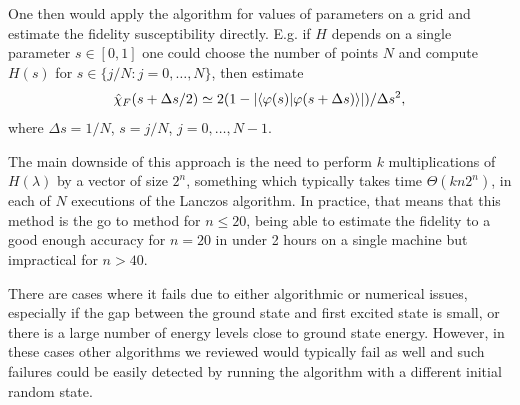 \documentclass[
  american,aps,pra,reprint,floatfix,nofootinbib,superscriptaddress
]{revtex4-2}
\newcommand{\abs}[1]{\left|#1\right|}
\begin{document}
One then would apply the algorithm for values of parameters on a grid
and estimate the fidelity susceptibility directly. E.g. if $H$ depends
on a single parameter $s\in[0,1]$ one could choose the number of points $N$
and compute $H(s)$ for $s\in\{j/N: j=0,\dots,N\}$, then estimate
\begin{equation}
  \hat \chi_F(s + \Delta s/2)
    \simeq 2 (1 - \abs{\braket{\varphi(s)| \varphi(s + \Delta s)}})
      / \Delta s^2,
\end{equation}
where $\Delta s = 1/N$, $s = j/N$, $j=0,\dots,N-1$.

The main downside of this approach is the need to perform $k$
multiplications of $H(\lambda)$ by a vector of size $2^n$, something
which typically takes time $\Theta(kn2^n)$, in each of $N$ executions
of the Lanczos algorithm. In practice, that means that
this method is the go to method for $n \leq 20$, being able to estimate
the fidelity to a good enough accuracy for $n=20$ in under 2 hours on a
single machine but impractical for $n > 40$.

There are cases where it fails due to either algorithmic or numerical issues,
especially if the gap between the ground state and first excited state is small,
or there is a large number of energy levels close to ground state energy.
However, in these cases other algorithms we reviewed would typically fail
as well and such failures could be easily detected by running the algorithm
with a different initial random state.
\end{document}
